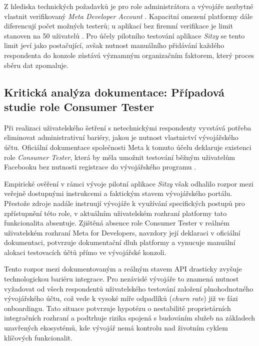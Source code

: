 \documentclass[male,czech,api_bc]{kitheses}
\begin{document}
Z hlediska technických požadavků je pro role administrátora a vývojáře nezbytné vlastnit verifikovaný \textit{Meta Developer Account} \cite{MetaAppRoles2025}. Kapacitní omezení platformy dále diferencují počet možných testerů; u aplikací bez firemní verifikace je limit stanoven na 50 uživatelů \cite{MetaAppRoles2025}. Pro účely pilotního testování aplikace \textit{Sitzy} se tento limit jeví jako postačující, avšak nutnost manuálního přidávání každého respondenta do konzole zůstává významným organizačním faktorem, který proces sběru dat zpomaluje.

\subsection{Kritická analýza dokumentace: Případová studie role Consumer Tester} \label{SpecifikaConsumerTester}

Při realizaci uživatelského šetření s netechnickými respondenty vyvstává potřeba eliminovat administrativní bariéry, jakou je nutnost vlastnictví vývojářského účtu. Oficiální dokumentace společnosti Meta k tomuto účelu deklaruje existenci role \textit{Consumer Tester}, která by měla umožnit testování běžným uživatelům Facebooku bez nutnosti registrace do vývojářského programu \cite{MetaAppRoles2025}.

Empirické ověření v rámci vývoje pilotní aplikace \textit{Sitzy} však odhalilo rozpor mezi veřejně dostupnými instrukcemi a faktickým stavem vývojářského portálu. Přestože zdroje \cite{MetaAppRoles2025, MetaAppTypes2025} nadále instruují vývojáře k využívání specifických postupů pro zpřístupnění této role, v aktuálním uživatelském rozhraní platformy tato funkcionalita absentuje. Zjištěná absence role Consumer Tester v reálném uživatelském rozhraní Meta for Developers, navzdory její deklaraci v oficiální dokumentaci, potvrzuje dokumentační dluh platformy a vynucuje manuální alokaci testovacích účtů přímo ve vývojářské konzoli.

Tento rozpor mezi dokumentovaným a reálným stavem API drasticky zvyšuje technologickou bariéru integrace. Pro nezávislé vývojáře to znamená nutnost vyžadovat od všech respondentů uživatelského testování založení plnohodnotného vývojářského účtu, což vede k vysoké míře odpadlíků (\textit{churn rate}) již ve fázi onboardingu. Tato situace potvrzuje hypotézu o nestabilitě proprietárních integračních rozhraní a podtrhuje rizika spojená s budováním služeb na základech uzavřených ekosystémů, kde vývojář nemá kontrolu nad životním cyklem klíčových funkcionalit.
\end{document}
